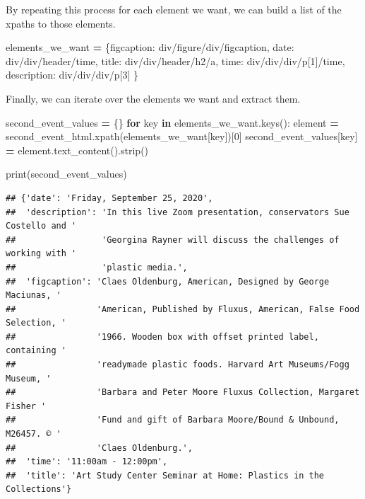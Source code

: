 \documentclass[
]{book}
\newenvironment{Shaded}{\begin{snugshade}}{\end{snugshade}}
\newcommand{\BuiltInTok}[1]{#1}
\newcommand{\ControlFlowTok}[1]{\textcolor[rgb]{0.13,0.29,0.53}{\textbf{#1}}}
\newcommand{\DecValTok}[1]{\textcolor[rgb]{0.00,0.00,0.81}{#1}}
\newcommand{\KeywordTok}[1]{\textcolor[rgb]{0.13,0.29,0.53}{\textbf{#1}}}
\newcommand{\NormalTok}[1]{#1}
\newcommand{\OperatorTok}[1]{\textcolor[rgb]{0.81,0.36,0.00}{\textbf{#1}}}
\newcommand{\StringTok}[1]{\textcolor[rgb]{0.31,0.60,0.02}{#1}}
\begin{document}
By repeating this process for each element we want, we can build a list of the xpaths to those elements.

\begin{Shaded}
\begin{Highlighting}[]
\NormalTok{elements\_we\_want }\OperatorTok{=}\NormalTok{ \{}\StringTok{\textquotesingle{}figcaption\textquotesingle{}}\NormalTok{: }\StringTok{\textquotesingle{}div/figure/div/figcaption\textquotesingle{}}\NormalTok{,}
                    \StringTok{\textquotesingle{}date\textquotesingle{}}\NormalTok{: }\StringTok{\textquotesingle{}div/div/header/time\textquotesingle{}}\NormalTok{,}
                    \StringTok{\textquotesingle{}title\textquotesingle{}}\NormalTok{: }\StringTok{\textquotesingle{}div/div/header/h2/a\textquotesingle{}}\NormalTok{,}
                    \StringTok{\textquotesingle{}time\textquotesingle{}}\NormalTok{: }\StringTok{\textquotesingle{}div/div/div/p[1]/time\textquotesingle{}}\NormalTok{,}
                    \StringTok{\textquotesingle{}description\textquotesingle{}}\NormalTok{: }\StringTok{\textquotesingle{}div/div/div/p[3]\textquotesingle{}}
\NormalTok{                    \}}
\end{Highlighting}
\end{Shaded}

Finally, we can iterate over the elements we want and extract them.

\begin{Shaded}
\begin{Highlighting}[]
\NormalTok{second\_event\_values }\OperatorTok{=}\NormalTok{ \{\}}
\ControlFlowTok{for}\NormalTok{ key }\KeywordTok{in}\NormalTok{ elements\_we\_want.keys():}
\NormalTok{    element }\OperatorTok{=}\NormalTok{ second\_event\_html.xpath(elements\_we\_want[key])[}\DecValTok{0}\NormalTok{]}
\NormalTok{    second\_event\_values[key] }\OperatorTok{=}\NormalTok{ element.text\_content().strip()}

\BuiltInTok{print}\NormalTok{(second\_event\_values)}
\end{Highlighting}
\end{Shaded}

\begin{verbatim}
## {'date': 'Friday, September 25, 2020',
##  'description': 'In this live Zoom presentation, conservators Sue Costello and '
##                 'Georgina Rayner will discuss the challenges of working with '
##                 'plastic media.',
##  'figcaption': 'Claes Oldenburg, American, Designed by George Maciunas, '
##                'American, Published by Fluxus, American, False Food Selection, '
##                '1966. Wooden box with offset printed label, containing '
##                'readymade plastic foods. Harvard Art Museums/Fogg Museum, '
##                'Barbara and Peter Moore Fluxus Collection, Margaret Fisher '
##                'Fund and gift of Barbara Moore/Bound & Unbound, M26457. © '
##                'Claes Oldenburg.',
##  'time': '11:00am - 12:00pm',
##  'title': 'Art Study Center Seminar at Home: Plastics in the Collections'}
\end{verbatim}
\end{document}
